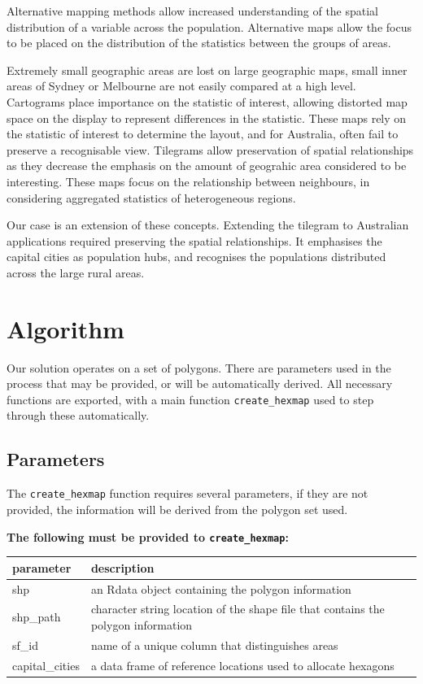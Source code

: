 Alternative mapping methods allow increased understanding of the spatial
distribution of a variable across the population. Alternative maps allow
the focus to be placed on the distribution of the statistics between the
groups of areas.

Extremely small geographic areas are lost on large geographic maps,
small inner areas of Sydney or Melbourne are not easily compared at a
high level. Cartograms place importance on the statistic of interest,
allowing distorted map space on the display to represent differences in
the statistic. These maps rely on the statistic of interest to determine
the layout, and for Australia, often fail to preserve a recognisable
view. Tilegrams allow preservation of spatial relationships as they
decrease the emphasis on the amount of geograhic area considered to be
interesting. These maps focus on the relationship between neighbours, in
considering aggregated statistics of heterogeneous regions.

Our case is an extension of these concepts. Extending the tilegram to
Australian applications required preserving the spatial relationships.
It emphasises the capital cities as population hubs, and recognises the
populations distributed across the large rural areas.

\hypertarget{algorithm}{%
\section{Algorithm}\label{algorithm}}

Our solution operates on a set of polygons. There are parameters used in
the process that may be provided, or will be automatically derived. All
necessary functions are exported, with a main function
\texttt{create\_hexmap} used to step through these automatically.

\hypertarget{parameters}{%
\subsection{Parameters}\label{parameters}}

The \texttt{create\_hexmap} function requires several parameters, if
they are not provided, the information will be derived from the polygon
set used.

\textbf{The following must be provided to \texttt{create\_hexmap}:}

\begin{Schunk}

\begin{tabular}{l|l}
\hline
parameter & description\\
\hline
shp & an Rdata object containing the polygon information\\
\hline
shp\_path & character string location of the shape file that contains the polygon information\\
\hline
sf\_id & name of a unique column that distinguishes areas\\
\hline
capital\_cities & a data frame of reference locations used to allocate hexagons\\
\hline
\end{tabular}

\end{Schunk}

